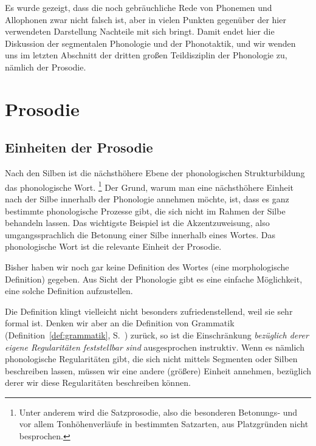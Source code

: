 Es wurde gezeigt, dass die noch gebräuchliche Rede von Phonemen und Allophonen zwar nicht falsch ist, aber in vielen Punkten gegenüber der hier verwendeten Darstellung Nachteile mit sich bringt.
Damit endet hier die Diskussion der segmentalen Phonologie und der Phonotaktik, und wir wenden uns im letzten Abschnitt der dritten großen Teildisziplin der Phonologie zu, nämlich der Prosodie.

\section{Prosodie}

\label{sec:prosodie}


\subsection{Einheiten der Prosodie}

Nach den Silben ist die nächsthöhere Ebene der phonologischen Strukturbildung das phonologische Wort.%
\footnote{Unter anderem wird die Satzprosodie, also die besonderen Betonungs- und vor allem Tonhöhenverläufe in bestimmten Satzarten, aus Platzgründen nicht besprochen.}
Der Grund, warum man eine nächsthöhere Einheit nach der Silbe innerhalb der Phonologie annehmen möchte, ist, dass es ganz bestimmte phonologische Prozesse gibt, die sich nicht im Rahmen der Silbe behandeln lassen.
Das wichtigste Beispiel ist die Akzentzuweisung, also umgangssprachlich die Betonung einer Silbe innerhalb eines Wortes.
Das phonologische Wort ist die relevante Einheit der Prosodie.

Bisher haben wir noch gar keine Definition des Wortes (\zB eine morphologische Definition) gegeben.
Aus Sicht der Phonologie gibt es eine einfache Möglichkeit, eine solche Definition aufzustellen. 


Die Definition klingt vielleicht nicht besonders zufriedenstellend, weil sie sehr formal ist.
Denken wir aber an die Definition von Grammatik (Definition~\ref{def:grammatik}, S.~\pageref{def:grammatik}) zurück, so ist die Einschränkung \textit{bezüglich derer eigene Regularitäten feststellbar sind} ausgesprochen instruktiv.
Wenn es nämlich phonologische Regularitäten gibt, die sich nicht mittels Segmenten oder Silben beschreiben lassen, müssen wir eine andere (größere) Einheit annehmen, bezüglich derer wir diese Regularitäten beschreiben können.

